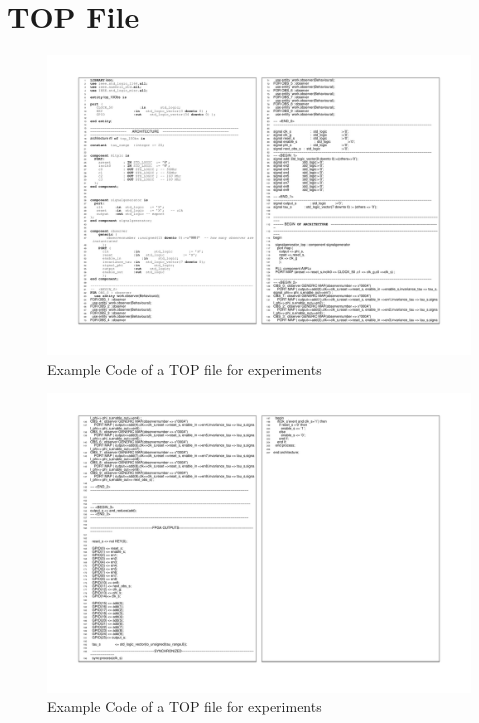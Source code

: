 \section{TOP File}
\label{appendix:1:section:2}

\begin{figure}[pt]
\centering
\includegraphics[scale=0.80,angle=90]{Appendix1/pdf/TOP_10OBS_1.pdf}
\caption[TOP File Example-p1]{Example Code of a TOP file for experiments}
\label{appendix:source:3}
\end{figure}


\begin{figure}[pt]
\centering
\includegraphics[scale=0.80,angle=90]{Appendix1/pdf/TOP_10OBS_2.pdf}
\caption[TOP File Example-p1]{Example Code of a TOP file for experiments}
\label{appendix:source:4}
\end{figure}













